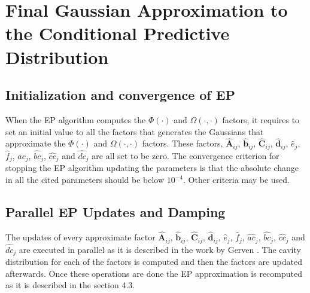 \section{Final Gaussian Approximation to the Conditional Predictive Distribution}

\subsection{Initialization and convergence of EP}
When the EP algorithm computes the $\Phi(\cdot)$ and $\Omega(\cdot,\cdot)$ factors, it requires to set an initial value to all the factors that generates the Gaussians that approximate the $\Phi(\cdot)$ and $\Omega(\cdot,\cdot)$ factors. These factors, $\hat{\boldsymbol{A}}_{ij}$, $\hat{\boldsymbol{b}}_{ij}$, $\hat{\boldsymbol{C}}_{ij}$, $\hat{\boldsymbol{d}}_{ij}$, $\hat{e}_{j}$, $\hat{f}_{j}$, $\hat{ac}_j$, $\hat{bc}_j$, $\hat{cc}_j$ and $\hat{dc}_j$ are all set to be zero. The convergence criterion for stopping the EP algorithm updating the parameters is that the absolute change in all the cited parameters should be below $10^{-4}$. Other criteria may be used.

\subsection{Parallel EP Updates and Damping}

The updates of every approximate factor $\hat{\boldsymbol{A}}_{ij}$, $\hat{\boldsymbol{b}}_{ij}$, $\hat{\boldsymbol{C}}_{ij}$, $\hat{\boldsymbol{d}}_{ij}$, $\hat{e}_{j}$, $\hat{f}_{j}$, $\hat{ac}_j$, $\hat{bc}_j$, $\hat{cc}_j$ and $\hat{dc}_j$ are executed in parallel as it is described in the work by Gerven \citep{gerven2009bayesian}. The cavity distribution for each of the factors is computed and then the factors are updated afterwards. Once these operations are done the EP approximation is recomputed as it is described in the section 4.3.

